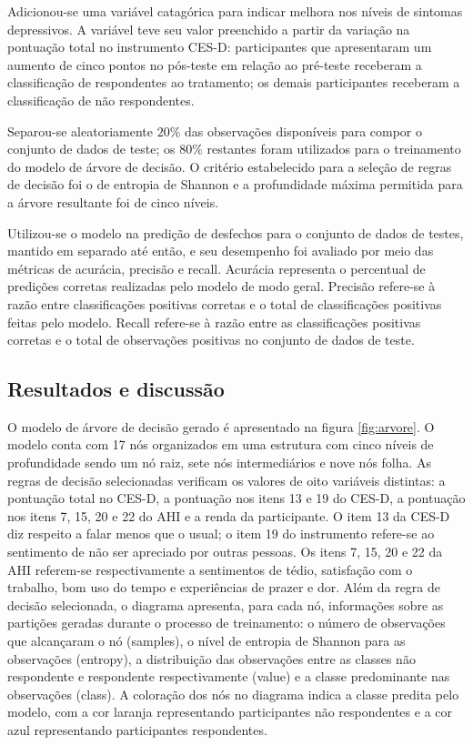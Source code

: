Adicionou-se uma variável catagórica para indicar melhora nos níveis de sintomas depressivos. A variável teve seu valor preenchido a partir da variação na pontuação total no instrumento CES-D:
participantes que apresentaram um aumento de cinco pontos no pós-teste em relação ao pré-teste receberam a classificação de respondentes ao tratamento; os demais participantes receberam a
classificação de não respondentes.

Separou-se aleatoriamente $20\%$ das observações disponíveis para compor o conjunto de dados de teste; os $80\%$ restantes foram utilizados para o treinamento do modelo de árvore de decisão.
O critério estabelecido para a seleção de regras de decisão foi o de entropia de Shannon \cite{ScikitLearn} e a profundidade máxima permitida para a árvore resultante foi de cinco níveis.

Utilizou-se o modelo na predição de desfechos para o conjunto de dados de testes, mantido em separado até então, e seu desempenho foi avaliado por meio das métricas de acurácia, precisão e
recall. Acurácia representa o percentual de predições corretas realizadas pelo modelo de modo geral. Precisão refere-se à razão entre classificações positivas corretas e o total de classificações
positivas feitas pelo modelo. Recall refere-se à razão entre as classificações positivas corretas e o total de observações positivas no conjunto de dados de teste.

\subsection{Resultados e discussão}

O modelo de árvore de decisão gerado é apresentado na figura \ref{fig:arvore}. O modelo conta com 17 nós organizados em uma estrutura com cinco níveis de profundidade sendo um nó raiz, sete
nós intermediários e nove nós folha. As regras de decisão selecionadas verificam os valores de oito variáveis distintas: a pontuação total no CES-D, a pontuação nos itens 13 e 19 do CES-D,
a pontuação nos itens 7, 15, 20 e 22 do AHI e a renda da participante. O item 13 da CES-D diz respeito a falar menos que o usual; o item 19 do instrumento refere-se ao sentimento de não ser
apreciado por outras pessoas. Os itens 7, 15, 20 e 22 da AHI referem-se respectivamente a sentimentos de tédio, satisfação com o trabalho, bom uso do tempo e experiências de prazer e dor.
Além da regra de decisão selecionada, o diagrama apresenta, para cada nó, informações sobre as partições geradas durante o processo de treinamento: o número de observações que alcançaram o
nó (samples), o nível de entropia de Shannon para as observações (entropy), a distribuição das observações entre as classes não respondente e respondente respectivamente (value) e a classe
predominante nas observações (class). A coloração dos nós no diagrama indica a classe predita pelo modelo, com a cor laranja representando participantes não respondentes e a cor azul representando
participantes respondentes.

